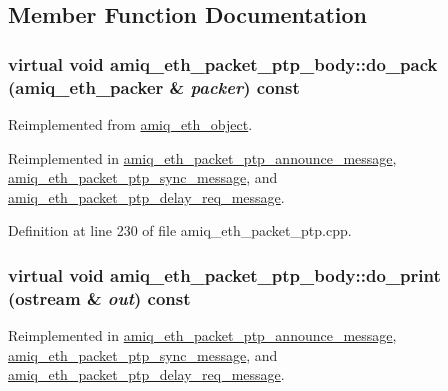 \subsection{Member Function Documentation}
\hypertarget{classamiq__eth__packet__ptp__body_a3df3ad9b3a4ef7ec42357565d44ede05}{
\subsubsection[{do\_\-pack}]{\setlength{\rightskip}{0pt plus 5cm}virtual void amiq\_\-eth\_\-packet\_\-ptp\_\-body::do\_\-pack ({\bf amiq\_\-eth\_\-packer} \& {\em packer}) const}}
\label{classamiq__eth__packet__ptp__body_a3df3ad9b3a4ef7ec42357565d44ede05}


Reimplemented from \hyperlink{classamiq__eth__object_a1c8e3c7f04c5a75ccfdb5140f1559879}{amiq\_\-eth\_\-object}.

Reimplemented in \hyperlink{classamiq__eth__packet__ptp__announce__message_a158d8eb0b4081bdfbce9d4b34be6daf7}{amiq\_\-eth\_\-packet\_\-ptp\_\-announce\_\-message}, \hyperlink{classamiq__eth__packet__ptp__sync__message_a5bb7abd15c0d2d2d733f042ad13c898d}{amiq\_\-eth\_\-packet\_\-ptp\_\-sync\_\-message}, and \hyperlink{classamiq__eth__packet__ptp__delay__req__message_a746ff6b9bc45d17e7158525b6433f21a}{amiq\_\-eth\_\-packet\_\-ptp\_\-delay\_\-req\_\-message}.

Definition at line 230 of file amiq\_\-eth\_\-packet\_\-ptp.cpp.\hypertarget{classamiq__eth__packet__ptp__body_a44ff8df4c84f236f8bab792ceb338e6a}{
\subsubsection[{do\_\-print}]{\setlength{\rightskip}{0pt plus 5cm}virtual void amiq\_\-eth\_\-packet\_\-ptp\_\-body::do\_\-print (ostream \& {\em out}) const}}
\label{classamiq__eth__packet__ptp__body_a44ff8df4c84f236f8bab792ceb338e6a}


Reimplemented in \hyperlink{classamiq__eth__packet__ptp__announce__message_aba766be017b0eb4137a5fac7143c598b}{amiq\_\-eth\_\-packet\_\-ptp\_\-announce\_\-message}, \hyperlink{classamiq__eth__packet__ptp__sync__message_a3eca4a1338800bcac5fdac104f350366}{amiq\_\-eth\_\-packet\_\-ptp\_\-sync\_\-message}, and \hyperlink{classamiq__eth__packet__ptp__delay__req__message_aac81caa439938e5eb0c2af2dbd9c82ee}{amiq\_\-eth\_\-packet\_\-ptp\_\-delay\_\-req\_\-message}.

